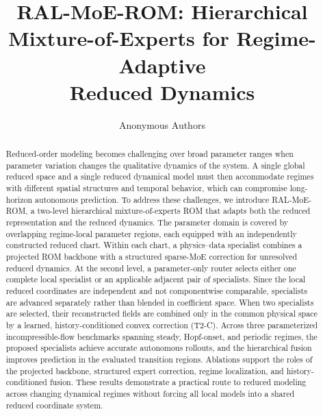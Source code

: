 \documentclass{article}
\title{RAL-MoE-ROM: Hierarchical\\
Mixture-of-Experts for Regime-Adaptive\\
Reduced Dynamics}
\author{Anonymous Authors}
\begin{document}
\maketitle

\begin{abstract}
Reduced-order modeling becomes challenging over broad parameter ranges when parameter variation changes the qualitative dynamics of the system. A single global reduced space and a single reduced dynamical model must then accommodate regimes with different spatial structures and temporal behavior, which can compromise long-horizon autonomous prediction. To address these challenges, we introduce RAL-MoE-ROM, a two-level hierarchical mixture-of-experts ROM that adapts both the reduced representation and the reduced dynamics. The parameter domain is covered by overlapping regime-local parameter regions, each equipped with an independently constructed reduced chart. Within each chart, a physics--data specialist combines a projected ROM backbone with a structured sparse-MoE correction for unresolved reduced dynamics. At the second level, a parameter-only router selects either one complete local specialist or an applicable adjacent pair of specialists. Since the local reduced coordinates are independent and not componentwise comparable, specialists are advanced
separately rather than blended in coefficient space. When two specialists are selected, their reconstructed fields are combined only in the common physical space by a learned, history-conditioned convex correction (T2-C). Across three parameterized incompressible-flow benchmarks spanning steady, Hopf-onset, and periodic regimes, the proposed specialists achieve accurate autonomous rollouts, and the hierarchical fusion improves prediction in the evaluated transition regions. Ablations support the roles of the projected
backbone, structured expert correction, regime localization, and
history-conditioned fusion. These results demonstrate a practical route to reduced modeling across changing dynamical regimes without forcing all
local models into a shared reduced coordinate system.
\end{abstract}





\FloatBarrier

\end{document}
